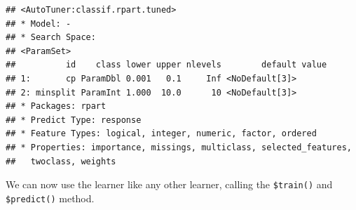 \documentclass[
]{scrbook}
\newenvironment{Shaded}{\begin{snugshade}}{\end{snugshade}}
\newcommand{\AttributeTok}[1]{\textcolor[rgb]{0.77,0.63,0.00}{#1}}
\newcommand{\DecValTok}[1]{\textcolor[rgb]{0.00,0.00,0.81}{#1}}
\newcommand{\FloatTok}[1]{\textcolor[rgb]{0.00,0.00,0.81}{#1}}
\newcommand{\FunctionTok}[1]{\textcolor[rgb]{0.00,0.00,0.00}{#1}}
\newcommand{\NormalTok}[1]{#1}
\newcommand{\OtherTok}[1]{\textcolor[rgb]{0.56,0.35,0.01}{#1}}
\newcommand{\SpecialCharTok}[1]{\textcolor[rgb]{0.00,0.00,0.00}{#1}}
\newcommand{\StringTok}[1]{\textcolor[rgb]{0.31,0.60,0.02}{#1}}
\renewenvironment{Shaded} {\begin{snugshade}\small} {\end{snugshade}}
\begin{document}
\begin{Shaded}
\end{Shaded}

\begin{verbatim}
## <AutoTuner:classif.rpart.tuned>
## * Model: -
## * Search Space:
## <ParamSet>
##          id    class lower upper nlevels        default value
## 1:       cp ParamDbl 0.001   0.1     Inf <NoDefault[3]>      
## 2: minsplit ParamInt 1.000  10.0      10 <NoDefault[3]>      
## * Packages: rpart
## * Predict Type: response
## * Feature Types: logical, integer, numeric, factor, ordered
## * Properties: importance, missings, multiclass, selected_features,
##   twoclass, weights
\end{verbatim}

We can now use the learner like any other learner, calling the \texttt{\$train()} and \texttt{\$predict()} method.

\begin{Shaded}
\end{Shaded}
\end{document}
